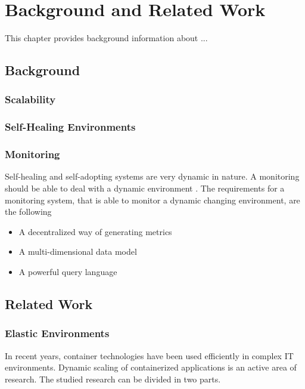 \chapter{Background and Related Work}
\label{sec:related}
%

This chapter provides background information about ...

\section{Background}

\subsection{Scalability}

\subsection{Self-Healing Environments}

\subsection{Monitoring}
Self-healing and self-adopting systems are very dynamic in nature. A monitoring should be able to deal with a dynamic environment \cite{Farcic2017Toolkit21}.
The requirements for a monitoring system, that is able to monitor a dynamic changing environment, are the following \cite{Farcic2017Toolkit21}
\begin{itemize}
\item A decentralized way of generating metrics %
\item A multi-dimensional data model %
\item A powerful query language
\end{itemize}



\section{Related Work}
\subsection{Elastic Environments}
In recent years, container technologies have been used efficiently in complex IT environments. Dynamic scaling of containerized applications is an active area of research. The studied research can be divided in two parts. 


